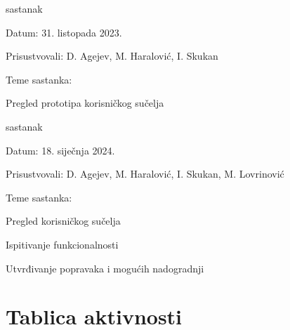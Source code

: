\begin{packed_enum}
			\item  sastanak
			\item[] \begin{packed_item}
				\item Datum: 31. listopada 2023.
				\item Prisustvovali:  D. Agejev, M. Haralović, I. Skukan
				\item Teme sastanka:
				\begin{packed_item}
					\item  Pregled prototipa korisničkog sučelja
				\end{packed_item}
			\end{packed_item}
			
			\item  sastanak
			\item[] \begin{packed_item}
				\item Datum: 18. siječnja 2024.
				\item Prisustvovali:  D. Agejev, M. Haralović, I. Skukan, M. Lovrinović
				\item Teme sastanka:
				\begin{packed_item}
					\item  Pregled korisničkog sučelja
					\item  Ispitivanje funkcionalnosti
					\item  Utvrđivanje popravaka i mogućih nadogradnji
				\end{packed_item}
			\end{packed_item}
			
			
		\end{packed_enum}
		
		\eject
		\section*{Tablica aktivnosti}

